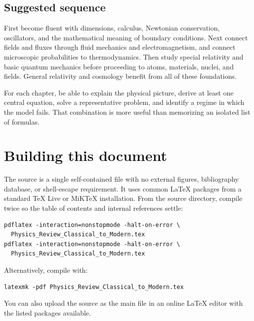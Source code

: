 \documentclass[11pt,oneside]{book}
\theoremstyle{reviewstyle}
\begin{document}
\section*{Suggested sequence}
First become fluent with dimensions, calculus, Newtonian conservation, oscillators, and the mathematical meaning of boundary conditions. Next connect fields and fluxes through fluid mechanics and electromagnetism, and connect microscopic probabilities to thermodynamics. Then study special relativity and basic quantum mechanics before proceeding to atoms, materials, nuclei, and fields. General relativity and cosmology benefit from all of these foundations.

For each chapter, be able to explain the physical picture, derive at least one central equation, solve a representative problem, and identify a regime in which the model fails. That combination is more useful than memorizing an isolated list of formulas.
\backmatter
\chapter*{Building this document}
The source is a single self-contained file with no external figures, bibliography database, or shell-escape requirement. It uses common LaTeX packages from a standard TeX Live or MiKTeX installation. From the source directory, compile twice so the table of contents and internal references settle:
\begin{verbatim}
pdflatex -interaction=nonstopmode -halt-on-error \
  Physics_Review_Classical_to_Modern.tex
pdflatex -interaction=nonstopmode -halt-on-error \
  Physics_Review_Classical_to_Modern.tex
\end{verbatim}
Alternatively, compile with:
\begin{verbatim}
latexmk -pdf Physics_Review_Classical_to_Modern.tex
\end{verbatim}
You can also upload the source as the main file in an online LaTeX editor with the listed packages available.
\end{document}
